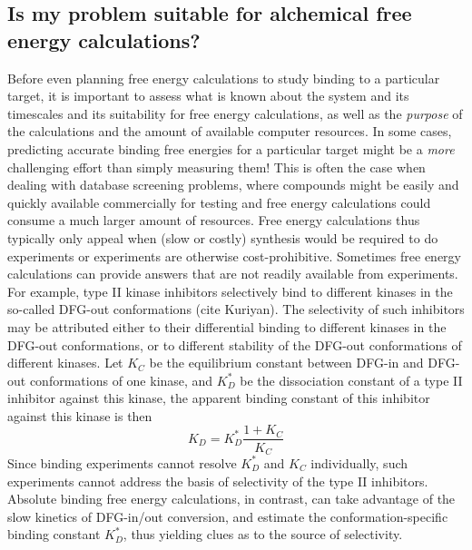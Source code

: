 \documentclass[9pt,bestpractices]{livecoms}
\begin{document}
\subsection{Is my problem suitable for alchemical free energy calculations?}
\label{subsec:suitability}
Before even planning free energy calculations to study binding to a
particular target, it is important to assess what is known about the
system and its timescales and its suitability for free energy
calculations, as well as the \emph{purpose} of the calculations and
the amount of available computer resources. In some cases, predicting
accurate binding free energies for a particular target might be a
\emph{more} challenging effort than simply measuring them! This is
often the case when dealing with database screening problems, where
compounds might be easily and quickly available commercially for
testing and free energy calculations could consume a much larger
amount of resources. Free energy calculations thus typically only
appeal when (slow or costly) synthesis would be required to do
experiments or experiments are otherwise cost-prohibitive.
%
Sometimes free energy calculations can provide answers that are not
readily available from experiments.  For example, type II kinase
inhibitors selectively bind to different kinases in the so-called
DFG-out conformations (cite Kuriyan).  The selectivity of such
inhibitors may be attributed either to their differential binding to
different kinases in the DFG-out conformations, or to different
stability of the DFG-out conformations of different kinases.  Let
$K_C$ be the equilibrium constant between DFG-in and DFG-out
conformations of one kinase, and $K_D^\ast$ be the dissociation
constant of a type II inhibitor against this kinase, the apparent
binding constant of this inhibitor against this kinase is then
\begin{equation}
  K_D = K_D^\ast \frac{1 + K_C}{K_C}
  \label{eqn:conformational-binding}
\end{equation}
%
Since binding experiments cannot resolve $K_D^\ast$ and $K_C$ individually, such experiments cannot address the basis of selectivity of the type II inhibitors.  Absolute binding free energy calculations, in contrast, can take advantage of the slow kinetics of DFG-in/out conversion, and estimate the conformation-specific binding constant $K_D^\ast$, thus yielding clues as to the source of selectivity.
%
\end{document}
